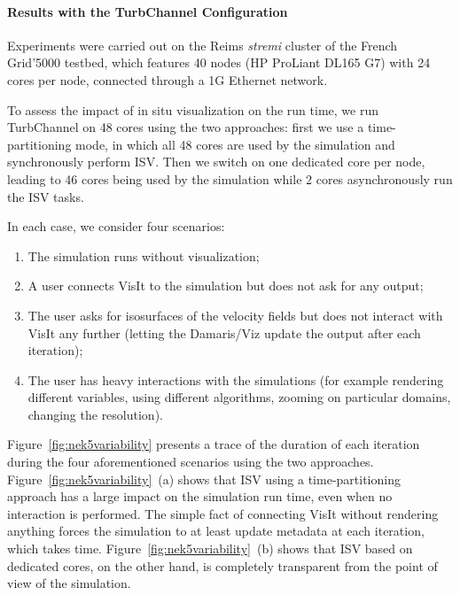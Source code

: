 \paragraph{Results with the TurbChannel Configuration}
Experiments were carried out on the Reims \emph{stremi} cluster of the French 
Grid'5000 testbed, which features 40 nodes (HP ProLiant DL165 G7) with 24 cores
per node, connected through a 1G Ethernet network.

To assess the impact of in situ visualization on the run time, we run 
TurbChannel on 48 cores using the two approaches: first we use a 
time-partitioning mode, in which all 48 cores are used by the simulation and 
synchronously perform ISV. Then we switch on one dedicated core per node,
leading to 46 cores being used by the simulation while 2 cores asynchronously run 
the ISV tasks.

In each case, we consider four scenarios: 
\begin{enumerate}
	\item The simulation runs without visualization;
	\item A user connects VisIt to the simulation but does not ask for any output;
	\item The user asks for isosurfaces of the velocity fields but does not interact with VisIt any further 
	(letting the Damaris/Viz update the output after each iteration);
	\item The user has heavy interactions with the simulations (for example rendering different variables, 
using different algorithms, zooming on particular domains, changing the 
resolution).
\end{enumerate}

Figure~\ref{fig:nek5variability} presents a trace of the duration of each
iteration during the four aforementioned scenarios using the two approaches.
Figure~\ref{fig:nek5variability}~(a) shows that ISV using 
a time-partitioning approach has a large impact on the 
simulation run time, even when no interaction is performed. The simple fact of connecting
VisIt without rendering anything forces the simulation to at least update metadata at each iteration,
which takes time.
Figure~\ref{fig:nek5variability}~(b) shows that ISV based on dedicated cores, 
on the other hand, is completely transparent from the point of view of the simulation.

